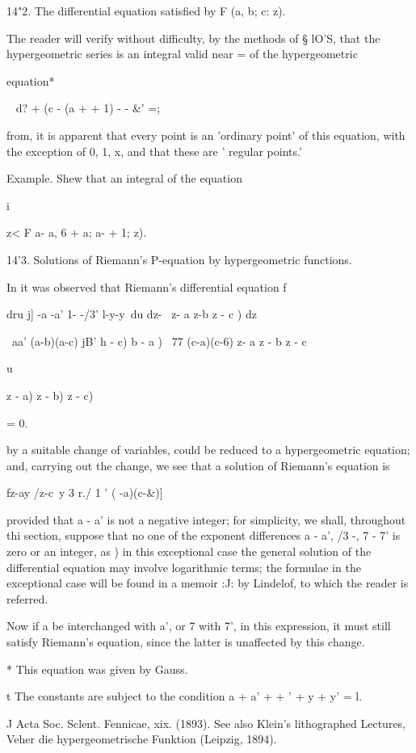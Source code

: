14"2. The differential equation satisfied by F (a, b; c: z).

The reader will verify without difficulty, by the methods of § lO'S,
that the hypergeometric series is an integral valid near = of the
hypergeometric

equation*

   ~ d? + (c - (a + + 1) - - \&' =;

from, it is apparent that every point is an 'ordinary point' of
this equation, with the exception of 0, 1, x, and that these are '
regular points.'

Example. Shew that an integral of the equation

i

z< F a- a, 6 + a; a- + 1; z).

14'3. Solutions of Riemann's P-equation by hypergeometric functions.

In it was observed that Riemann's differential equation f

dru j] -a -a' 1- -/3' l-y-y\ du dz- \ z- a z-b z - c ) dz

\ aa' (a-b)(a-c) jB' h - c) b - a ) \ 77 (c-a)(c-6) z- a z - b z - c

u

 z - a) z - b) z - c)

= 0.

by a suitable change of variables, could be reduced to a
hypergeometric equation; and, carrying out the change, we see that a
solution of Riemann's equation is

fz-ay /z-c\ y 3 r./ 1 ' ( -a)(c-\&)]

provided that a - a' is not a negative integer; for simplicity, we
shall, throughout thi section, suppose that no one of the exponent
differences a - a', /3 -, 7 - 7' is zero or an integer, as )
in this exceptional case the general solution of the differential
equation may involve logarithmic terms; the formulae in the
exceptional case will be found in a memoir :J: by Lindelof, to which
the reader is referred.

Now if a be interchanged with a', or 7 with 7', in this expression, it
must still satisfy Riemann's equation, since the latter is unaffected
by this change.

* This equation was given by Gauss.

t The constants are subject to the condition a + a' + + ' + y + y' =
l.

J Acta Soc. Sclent. Fennicae, xix. (1893). See also Klein's
lithographed Lectures, Veher die hypergeometrische Funktion (Leipzig,
1894).

